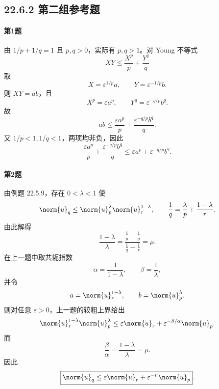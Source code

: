 \subsection*{22.6.2 第二组参考题}

\paragraph{第1题}
\begin{xsolution}
由 $1/p+1/q=1$ 且 $p,q>0$，实际有 $p,q>1$。对 Young 不等式
\[
  XY\le\frac{X^p}{p}+\frac{Y^q}{q}
\]
取
\[
  X=\varepsilon^{1/p}a,
  \qquad
  Y=\varepsilon^{-1/p}b.
\]
则 $XY=ab$，且
\[
  X^p=\varepsilon a^p,
  \qquad
  Y^q=\varepsilon^{-q/p}b^q.
\]
故
\[
  ab\le\frac{\varepsilon a^p}{p}
  +\frac{\varepsilon^{-q/p}b^q}{q}.
\]
又 $1/p<1,1/q<1$，两项均非负，因此
\[
  \frac{\varepsilon a^p}{p}
  +\frac{\varepsilon^{-q/p}b^q}{q}
  \le\varepsilon a^p+\varepsilon^{-q/p}b^q.
\]
\end{xsolution}

\paragraph{第2题}
\begin{xsolution}
由例题 22.5.9，存在 $0<\lambda<1$ 使
\[
  \norm{u}_q\le\norm{u}_p^\lambda\norm{u}_r^{1-\lambda},
  \qquad
  \frac1q=\frac\lambda p+\frac{1-\lambda}{r}.
\]
由此解得
\[
  \frac{1-\lambda}{\lambda}
  =\frac{\frac1p-\frac1q}{\frac1q-\frac1r}
  =\mu.
\]
在上一题中取共轭指数
\[
  \alpha=\frac1{1-\lambda},
  \qquad
  \beta=\frac1\lambda,
\]
并令
\[
  a=\norm{u}_r^{1-\lambda},
  \qquad
  b=\norm{u}_p^\lambda.
\]
则对任意 $\varepsilon>0$，上一题的较粗上界给出
\[
  \norm{u}_r^{1-\lambda}\norm{u}_p^\lambda
  \le\varepsilon\norm{u}_r
  +\varepsilon^{-\beta/\alpha}\norm{u}_p.
\]
而
\[
  \frac\beta\alpha=\frac{1-\lambda}{\lambda}=\mu.
\]
因此
\[
  \boxed{\norm{u}_q\le\varepsilon\norm{u}_r
  +\varepsilon^{-\mu}\norm{u}_p}.
\]
\end{xsolution}


